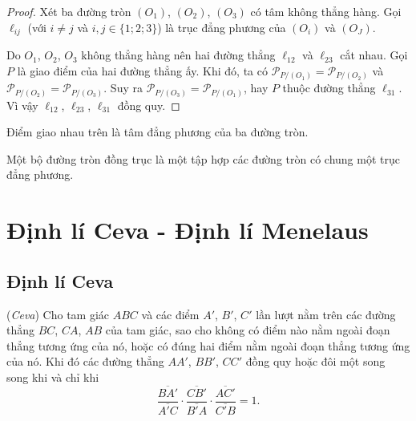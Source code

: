         \begin{proof}
            Xét ba đường tròn \((O_1)\), \((O_2)\), \((O_3)\) có tâm không thẳng hàng. Gọi \(\ell_{ij}\) (với \(i \neq j\) và \(i,j \in \{1;2;3\}\)) là trục đẳng phương của \((O_i)\) và \((O_J)\).
    
            Do \(O_1\), \(O_2\), \(O_3\) không thẳng hàng nên hai đường thẳng \(\ell_{12}\) và \(\ell_{23}\) cắt nhau. Gọi \(P\) là giao điểm của hai đường thẳng ấy. Khi đó, ta có \(\mathcal{P}_{P/(O_1)} = \mathcal{P}_{P/(O_2)}\) và \(\mathcal{P}_{P/(O_2)} = \mathcal{P}_{P/(O_3)}\). Suy ra \(\mathcal{P}_{P/(O_3)} = \mathcal{P}_{P/(O_1)}\), hay \(P\) thuộc đường thẳng \(\ell_{31}\). Vì vậy \(\ell_{12}\), \(\ell_{23}\), \(\ell_{31}\) đồng quy.
        \end{proof}
    
        \begin{definition}
            Điểm giao nhau trên là tâm đẳng phương của ba đường tròn.
        \end{definition}
    
        \begin{definition}
            Một bộ đường tròn đồng trục là một tập hợp các đường tròn có chung một trục đẳng phương.
        \end{definition}

\section{Định lí Ceva - Định lí Menelaus}

    \subsection{Định lí Ceva}

        \begin{theorem}
            (\textit{Ceva}) Cho tam giác \(ABC\) và các điểm \(A'\), \(B'\), \(C'\) lần lượt nằm trên các đường thẳng \(BC\), \(CA\), \(AB\) của tam giác, sao cho không có điểm nào nằm ngoài đoạn thẳng tương ứng của nó, hoặc có đúng hai điểm nằm ngoài đoạn thẳng tương ứng của nó. Khi đó các đường thẳng \(AA'\), \(BB'\), \(CC'\) đồng quy hoặc đôi một song song khi và chỉ khi
            \[\frac{\overline{BA'}}{\overline{A'C}} \cdot \frac{\overline{CB'}}{\overline{B'A}} \cdot \frac{\overline{AC'}}{\overline{C'B}} = 1.\]
        \end{theorem}

